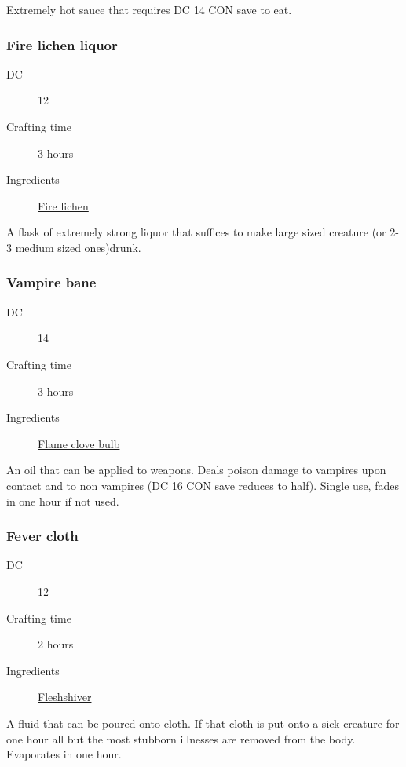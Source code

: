 Extremely hot sauce that requires DC 14 CON save to eat.

\subsubsection{Fire lichen liquor}
\label{Fire lichen liquor}

\begin{description}
\item [DC] 12
\item [Crafting time] 3 hours
\item [Ingredients] \hyperref[Fire lichen]{Fire lichen}
\end{description}

A flask of extremely strong liquor that suffices to make large sized creature (or 2-3 medium sized ones)drunk.

\subsubsection{Vampire bane}
\label{Vampire bane}

\begin{description}
\item [DC] 14
\item [Crafting time] 3 hours
\item [Ingredients] \hyperref[Flame clove]{Flame clove bulb}
\end{description}

An oil that can be applied to weapons. Deals  poison damage to vampires upon contact and 
 to non vampires (DC 16 CON save reduces to half). Single use, fades in one hour if not used.

\subsubsection{Fever cloth}
\label{Fever cloth}

\begin{description}
\item [DC] 12
\item [Crafting time] 2 hours
\item [Ingredients] \hyperref[Fleshshiver]{Fleshshiver}
\end{description}

A fluid that can be poured onto cloth. If that cloth is put onto a sick creature for one hour
 all but the most stubborn illnesses are removed from the body. Evaporates in one hour.

